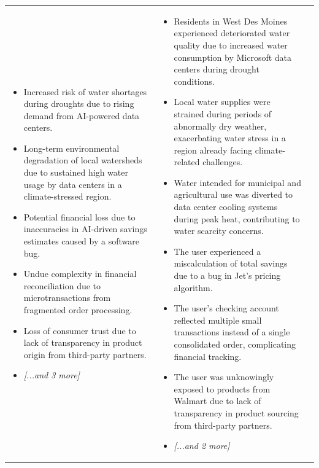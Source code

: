 \begin{longtable}{p{5.2cm}|p{5.2cm}|p{5.2cm}}
\begin{itemize}[leftmargin=*, nosep, before=\vspace{-0.5\baselineskip}, after=\vspace{-0.5\baselineskip}]
\item Increased risk of water shortages during droughts due to rising demand from AI-powered data centers.
\item Long-term environmental degradation of local watersheds due to sustained high water usage by data centers in a climate-stressed region.
\item Potential financial loss due to inaccuracies in AI-driven savings estimates caused by a software bug.
\item Undue complexity in financial reconciliation due to microtransactions from fragmented order processing.
\item Loss of consumer trust due to lack of transparency in product origin from third-party partners.
\item \textit{[...and 3 more]}
\end{itemize} & \begin{itemize}[leftmargin=*, nosep, before=\vspace{-0.5\baselineskip}, after=\vspace{-0.5\baselineskip}] 
\footnotesize
\item Residents in West Des Moines experienced deteriorated water quality due to increased water consumption by Microsoft data centers during drought conditions.
\item Local water supplies were strained during periods of abnormally dry weather, exacerbating water stress in a region already facing climate-related challenges.
\item Water intended for municipal and agricultural use was diverted to data center cooling systems during peak heat, contributing to water scarcity concerns.
\item The user experienced a miscalculation of total savings due to a bug in Jet's pricing algorithm.
\item The user’s checking account reflected multiple small transactions instead of a single consolidated order, complicating financial tracking.
\item The user was unknowingly exposed to products from Walmart due to lack of transparency in product sourcing from third-party partners.
\item \textit{[...and 2 more]}
\end{itemize} & \begin{itemize}[leftmargin=*, nosep, before=\vspace{-0.5\baselineskip}, after=\vspace{-0.5\baselineskip}] 

\end{itemize}
\end{longtable}
